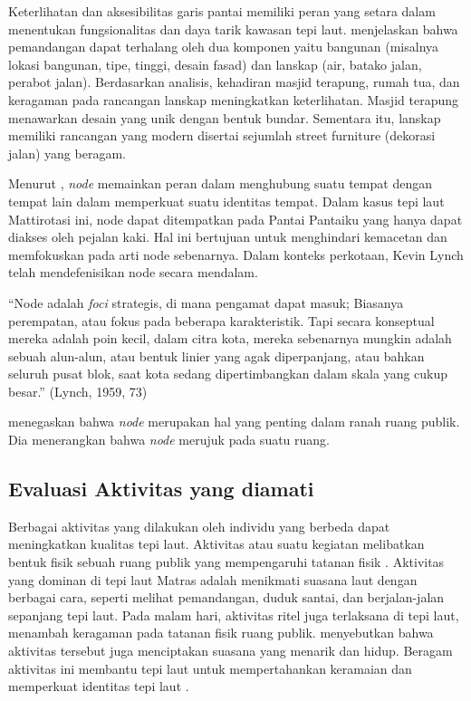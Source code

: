 \documentclass[11pt]{simart} %
\begin{document}
Keterlihatan dan aksesibilitas garis pantai memiliki peran yang setara dalam menentukan fungsionalitas dan daya tarik kawasan tepi laut.
\cite{wanismail2018} menjelaskan bahwa pemandangan dapat terhalang oleh dua komponen yaitu bangunan (misalnya lokasi bangunan, tipe, tinggi, desain fasad) dan lanskap (air, batako jalan, perabot jalan). Berdasarkan analisis, kehadiran masjid terapung, rumah tua, dan keragaman pada rancangan lanskap meningkatkan keterlihatan. Masjid terapung menawarkan desain yang unik dengan bentuk bundar. Sementara itu, lanskap memiliki rancangan yang modern disertai sejumlah street furniture (dekorasi jalan) yang beragam.

Menurut \cite{iqbal2020}, \textit{node} memainkan peran dalam menghubung suatu tempat dengan tempat lain dalam memperkuat suatu identitas tempat.
Dalam kasus tepi laut Mattirotasi ini, node dapat ditempatkan pada Pantai Pantaiku yang hanya dapat diakses oleh pejalan kaki. Hal ini bertujuan untuk menghindari kemacetan dan memfokuskan pada arti node sebenarnya. Dalam konteks perkotaan, Kevin Lynch telah mendefenisikan node secara mendalam.

``Node adalah \textit{foci} strategis, di mana pengamat dapat masuk;  Biasanya perempatan, atau fokus pada beberapa karakteristik. Tapi  secara konseptual mereka adalah poin kecil, dalam citra kota, mereka sebenarnya mungkin adalah sebuah alun-alun, atau bentuk linier yang agak diperpanjang, atau bahkan seluruh pusat blok, saat kota sedang dipertimbangkan dalam skala yang cukup besar.'' (Lynch, 1959, 73)


\cite{desai2018} menegaskan bahwa \textit{node} merupakan hal yang penting dalam ranah ruang publik. Dia menerangkan bahwa \textit{node} merujuk pada suatu ruang.









\subsection{Evaluasi Aktivitas yang diamati}%
\label{sub:Evaluasi Aktivitas yang diamati}

Berbagai aktivitas yang dilakukan oleh individu yang berbeda dapat meningkatkan kualitas tepi laut. Aktivitas atau suatu kegiatan melibatkan bentuk fisik sebuah ruang publik yang mempengaruhi tatanan fisik \citep{wanismail2018}. Aktivitas yang dominan di tepi laut Matras adalah menikmati suasana laut dengan berbagai cara, seperti melihat pemandangan, duduk santai, dan berjalan-jalan sepanjang tepi laut. Pada malam hari, aktivitas ritel juga terlaksana di tepi laut, menambah keragaman pada tatanan fisik ruang publik. \cite{wanismail2018} menyebutkan bahwa aktivitas tersebut juga menciptakan suasana yang menarik dan hidup. Beragam aktivitas ini membantu tepi laut untuk mempertahankan keramaian dan memperkuat identitas tepi laut \citep{iqbal2020}.
\end{document}
